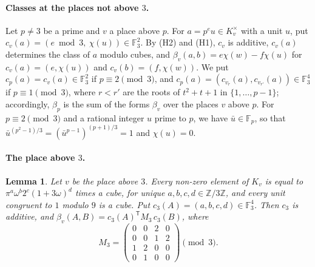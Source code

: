 \documentclass[11pt]{article}
\newtheorem{lemma}[theorem]{Lemma}
\newcommand{\Z}{\mathbb{Z}}
\newcommand{\F}{\mathbb{F}}
\begin{document}
\paragraph{Classes at the places not above $3$.} Let $p\neq3$ be a prime and $v$ a place above $p$. For $a=p^eu\in K_v^\times$ with a unit $u$, put $c_v(a)=(e\bmod3,\ \chi(u))\in\F_3^2$. By (H2) and (H1), $c_v$ is additive, $c_v(a)$ determines the class of $a$ modulo cubes, and $\beta_v(a,b)=e\chi(w)-f\chi(u)$ for $c_v(a)=(e,\chi(u))$ and $c_v(b)=(f,\chi(w))$. We put $c_p(a)=c_v(a)\in\F_3^2$ if $p\equiv2\pmod3$, and $c_p(a)=(c_{v_r}(a),c_{v_{r'}}(a))\in\F_3^4$ if $p\equiv1\pmod3$, where $r<r'$ are the roots of $t^2+t+1$ in $\{1,\dots,p-1\}$; accordingly, $\beta_p$ is the sum of the forms $\beta_v$ over the places $v$ above $p$. For $p\equiv2\pmod3$ and a rational integer $u$ prime to $p$, we have $\bar u\in\F_p$, so that $\bar u^{(p^2-1)/3}=(\bar u^{p-1})^{(p+1)/3}=1$ and $\chi(u)=0$.

\paragraph{The place above $3$.}
\begin{lemma}\label{lem:M3}
Let $v$ be the place above $3$. Every non-zero element of $K_v$ is equal to $\pi^a\omega^b2^c(1+3\omega)^d$ times a cube, for unique $a,b,c,d\in\Z/3\Z$, and every unit congruent to $1$ modulo $9$ is a cube. Put $c_3(A)=(a,b,c,d)\in\F_3^4$. Then $c_3$ is additive, and $\beta_v(A,B)=c_3(A)^{\mathsf T}M_3\,c_3(B)$, where
\[
M_3=\begin{pmatrix}0&0&2&0\\0&0&1&2\\1&2&0&0\\0&1&0&0\end{pmatrix}\pmod3.
\]
\end{lemma}
\end{document}
